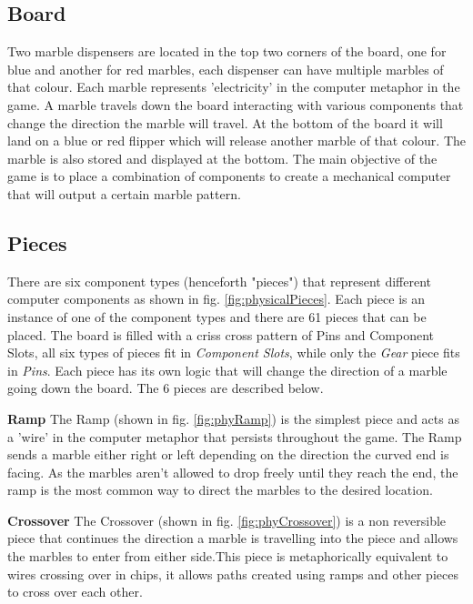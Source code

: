 \documentclass{l4proj}
\begin{document}
\subsection{Board}
Two marble dispensers are located in the top two corners of the board, one for blue and another for red marbles, each dispenser can have multiple marbles of that colour. Each marble represents 'electricity' in the computer metaphor in the game. A marble travels down the board interacting with various components that change the direction the marble will travel. At the bottom of the board it will land on a blue or red flipper which will release another marble of that colour. The marble is also stored and displayed at the bottom. The main objective of the game is to place a combination of components to create a mechanical computer that will output a certain marble pattern.



\subsection{Pieces}
\label{section:background-pieces}
There are six component types (henceforth "pieces") that represent different computer components as shown in fig. \ref{fig:physicalPieces}. Each piece is an instance of one of the component types and there are 61 pieces that can be placed. The board is filled with a criss cross pattern of Pins and Component Slots, all six types of pieces fit in \emph{Component Slots}, while only the \emph{Gear} piece fits in \emph{Pins}. Each piece has its own logic that will change the direction of a marble going down the board. The 6 pieces are described below.

\textbf{Ramp}
The Ramp (shown in fig. \ref{fig:phyRamp}) is the simplest piece and acts as a 'wire' in the computer metaphor that persists throughout the game. The Ramp sends a marble either right or left depending on the direction the curved end is facing. As the marbles aren't allowed to drop freely until they reach the end, the ramp is the most common way to direct the marbles to the desired location.

\textbf{Crossover}
The Crossover (shown in fig. \ref{fig:phyCrossover}) is a non reversible piece that continues the direction a marble is travelling into the piece and allows the marbles to enter from either side.This piece is metaphorically equivalent to wires crossing over in chips, it allows paths created using ramps and other pieces to cross over each other.
\end{document}

